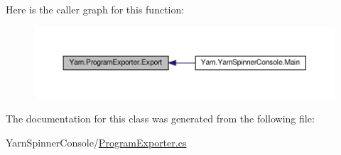 Here is the caller graph for this function\-:
\nopagebreak
\begin{figure}[H]
\begin{center}
\leavevmode
\includegraphics[width=350pt]{a00153_a3679a1f144471ea411fed34f6a79a18d_icgraph}
\end{center}
\end{figure}




The documentation for this class was generated from the following file\-:\begin{DoxyCompactItemize}
\item 
Yarn\-Spinner\-Console/\hyperlink{a00326}{Program\-Exporter.\-cs}\end{DoxyCompactItemize}
